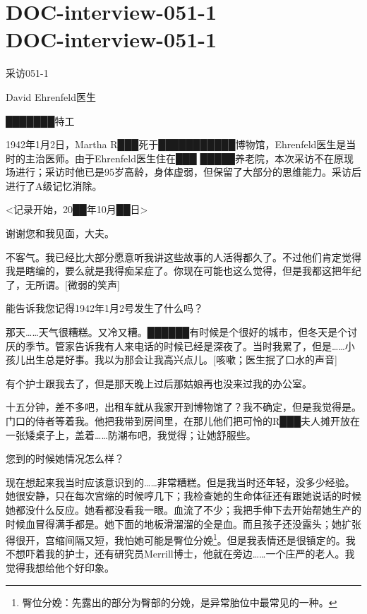 \chapter[DOC-interview-051-1]{
    DOC-interview-051-1 \\
    DOC-interview-051-1
}

\label{chap:DOC-interview-051-1}

采访051-1

David Ehrenfeld医生

███████特工

1942年1月2日，Martha R███死于███████████博物馆，Ehrenfeld医生是当时的主治医师。由于Ehrenfeld医生住在███ █████养老院，本次采访不在原现场进行；采访时他已是95岁高龄，身体虚弱，但保留了大部分的思维能力。采访后进行了A级记忆消除。

<记录开始，20██年10月██日>

谢谢您和我见面，大夫。

不客气。我已经比大部分愿意听我讲这些故事的人活得都久了。不过他们肯定觉得我是瞎编的，要么就是我得痴呆症了。你现在可能也这么觉得，但是我都这把年纪了，无所谓。{[}微弱的笑声]

能告诉我您记得1942年1月2号发生了什么吗？

那天……天气很糟糕。又冷又糟。██████有时候是个很好的城市，但冬天是个讨厌的季节。管家告诉我有人来电话的时候已经是深夜了。当时我累了，但是……小孩儿出生总是好事。我以为那会让我高兴点儿。{[}咳嗽；医生抿了口水的声音]

有个护士跟我去了，但是那天晚上过后那姑娘再也没来过我的办公室。

十五分钟，差不多吧，出租车就从我家开到博物馆了？我不确定，但是我觉得是。门口的侍者等着我。他把我带到房间里，在那儿他们把可怜的R███夫人摊开放在一张矮桌子上，盖着……防潮布吧，我觉得；让她舒服些。

您到的时候她情况怎么样？

现在想起来我当时应该意识到的……非常糟糕。但是我当时还年轻，没多少经验。她很安静，只在每次宫缩的时候哼几下；我检查她的生命体征还有跟她说话的时候她都没什么反应。她看都没看我一眼。血流了不少；我把手伸下去开始帮她生产的时候血冒得满手都是。她下面的地板滑溜溜的全是血。而且孩子还没露头；她扩张得很开，宫缩间隔又短，我怕她可能是臀位分娩\footnote{臀位分娩：先露出的部分为臀部的分娩，是异常胎位中最常见的一种。}。但是我表情还是很镇定的。我不想吓着我的护士，还有研究员Merrill博士，他就在旁边……一个庄严的老人。我觉得我想给他个好印象。

